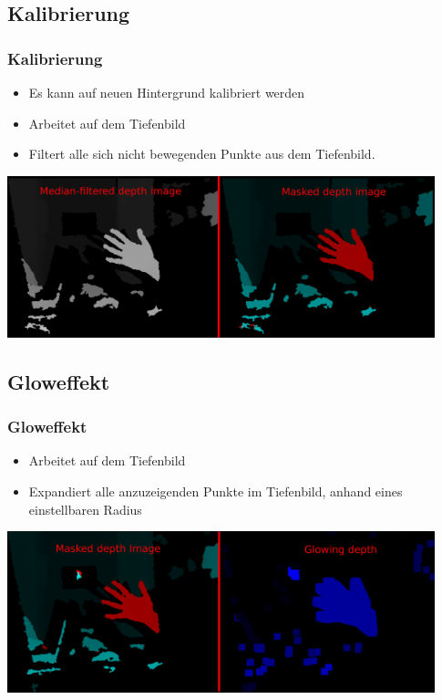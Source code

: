 \documentclass[compress]{beamer}
\begin{document}
\subsection{Kalibrierung}
\begin{frame}
\frametitle{Kalibrierung}
\begin{itemize}
	\item Es kann auf neuen Hintergrund kalibriert werden
	\item Arbeitet auf dem Tiefenbild
	\item Filtert alle sich nicht bewegenden Punkte aus dem Tiefenbild.
\end{itemize}
\includegraphics[width=12.4cm]{filter2.png}
\end{frame}

\subsection{Gloweffekt}
\begin{frame}
\frametitle{Gloweffekt}
\begin{itemize}
	\item Arbeitet auf dem Tiefenbild
	\item Expandiert alle anzuzeigenden Punkte im Tiefenbild, anhand eines einstellbaren Radius
\end{itemize}
\vspace*{0.5cm}
\includegraphics[width=12.4cm]{filter3.png}
\end{frame}
\end{document}
